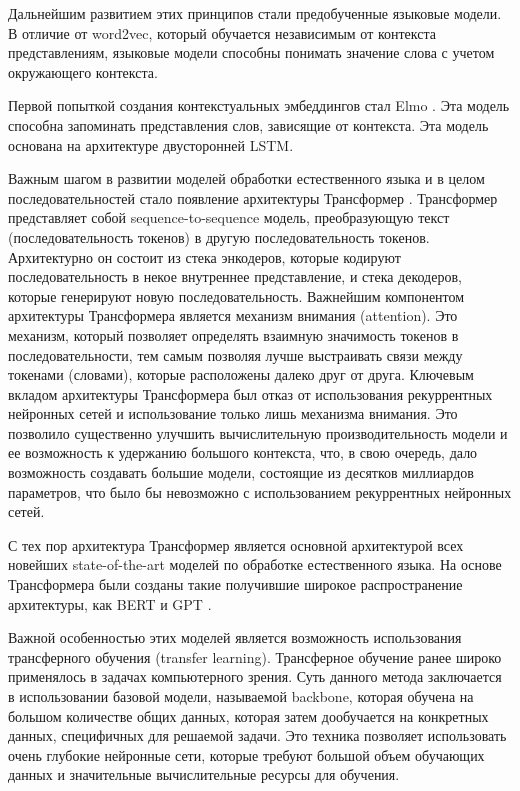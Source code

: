 Дальнейшим развитием этих принципов стали предобученные языковые модели. В отличие от word2vec, который обучается независимым от контекста представлениям, языковые модели способны понимать значение слова с учетом окружающего контекста.

Первой попыткой создания контекстуальных эмбеддингов стал Elmo \cite{elmo}. Эта модель способна запоминать представления слов, зависящие от контекста. Эта модель основана на архитектуре двусторонней LSTM.

Важным шагом в развитии моделей обработки естественного языка и в целом последовательностей стало появление архитектуры Трансформер \cite{transformer}. Трансформер представляет собой sequence-to-sequence модель, преобразующую текст (последовательность токенов) в другую последовательность токенов. Архитектурно он состоит из стека энкодеров, которые кодируют последовательность в некое внутреннее представление, и стека декодеров, которые генерируют новую последовательность. Важнейшим компонентом архитектуры Трансформера является механизм внимания (attention). Это механизм, который позволяет определять взаимную значимость токенов в последовательности, тем самым позволяя лучше выстраивать связи между токенами (словами), которые расположены далеко друг от друга. Ключевым вкладом архитектуры Трансформера был отказ от использования рекуррентных нейронных сетей и использование только лишь механизма внимания. Это позволило существенно улучшить вычислительную производительность модели и ее возможность к удержанию большого контекста, что, в свою очередь, дало возможность создавать большие модели, состоящие из десятков миллиардов параметров, что было бы невозможно с использованием рекуррентных нейронных сетей.

С тех пор архитектура Трансформер является основной архитектурой всех новейших state-of-the-art моделей по обработке естественного языка. На основе Трансформера были созданы такие получившие широкое распространение архитектуры, как BERT \cite{bert} и GPT \cite{gpt}.

Важной особенностью этих моделей является возможность использования трансферного обучения (transfer learning). Трансферное обучение ранее широко применялось в задачах компьютерного зрения. Суть данного метода заключается в использовании базовой модели, называемой backbone, которая обучена на большом количестве общих данных, которая затем дообучается на конкретных данных, специфичных для решаемой задачи. Это техника позволяет использовать очень глубокие нейронные сети, которые требуют большой объем обучающих данных и значительные вычислительные ресурсы для обучения.

